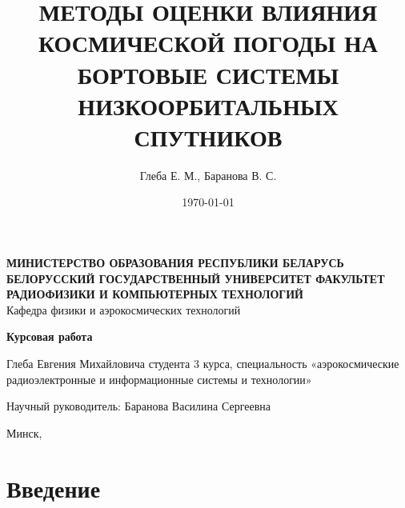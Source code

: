 \documentclass[14pt, a4paper]{extreport}
\title{МЕТОДЫ ОЦЕНКИ ВЛИЯНИЯ КОСМИЧЕСКОЙ ПОГОДЫ НА БОРТОВЫЕ СИСТЕМЫ НИЗКООРБИТАЛЬНЫХ СПУТНИКОВ}
\author{Глеба Е. М., Баранова В. С.}
\date{\today}
\begin{document}
    \setlength{\headheight}{17.0pt}

    \begin{titlepage}
        \begin{center}
            \Large \textbf{МИНИСТЕРСТВО ОБРАЗОВАНИЯ РЕСПУБЛИКИ БЕЛАРУСЬ БЕЛОРУССКИЙ ГОСУДАРСТВЕННЫЙ УНИВЕРСИТЕТ ФАКУЛЬТЕТ РАДИОФИЗИКИ И КОМПЬЮТЕРНЫХ ТЕХНОЛОГИЙ
            } \\
            Кафедра физики и аэрокосмических технологий
        \end{center}

        \vspace{3em}

        \begin{center}
            \Huge \textbf{Курсовая работа}
        \end{center}

        \begin{center}
            \Large \thetitle
        \end{center}

        \vspace{1.5cm}

        \hfill
        \parbox{14em}{
            Глеба Евгения Михайловича \newline
            студента 3 курса, \newline
            специальность «аэрокосмические радиоэлектронные и информационные системы и технологии»

            \vspace{0.5cm}

            Научный руководитель: \newline
            Баранова Василина Сергеевна
        }

        \vspace{3cm}

        \begin{center}
            Минск, \the\year
        \end{center}

    \end{titlepage}

    \tableofcontents

    \newpage

    \section{Введение}
\end{document}
